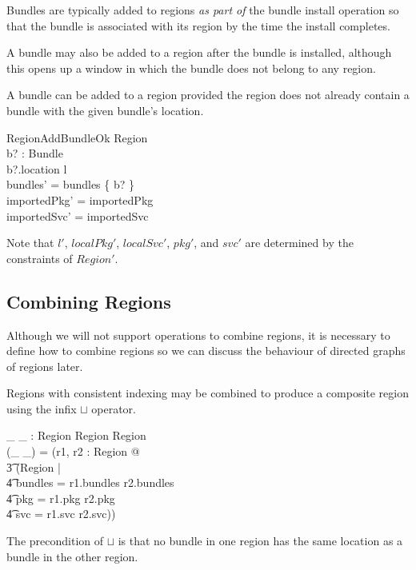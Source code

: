\documentclass[a4paper,9pt]{article}
\begin{document}
Bundles are typically added to regions \textit{as part of} the bundle install operation
so that the bundle is associated with its region by the time the
install completes.

A bundle may also be added to a region after the bundle is installed, although this opens up a window in
which the bundle does not belong to any region.

A bundle can be added to a region provided the region does not already contain a bundle with
the given bundle's location.
\begin{schema}{RegionAddBundleOk}
  \Delta Region \\
  b? : Bundle \\
\where
  b?.location \notin \dom l \\
  bundles' = bundles \cup \{ b? \} \\
  importedPkg' = importedPkg \\
  importedSvc' = importedSvc \\
\end{schema}
Note that $l'$, $localPkg'$, $localSvc'$, $pkg'$, and $svc'$ are determined by the constraints of $Region'$.

\subsection{Combining Regions}

Although we will not support operations to combine regions, it is necessary to define how to combine
regions so we can discuss the behaviour of directed graphs of regions later.

Regions with consistent indexing may be combined to produce a composite region using the infix $\sqcup$ operator.
\begin{axdef}
 \_ \sqcup \_ : Region \cross Region \pfun Region \\
\where
 (\_ \sqcup \_) = (\lambda r1, r2 : Region @ \\
\t3 (\mu Region | \\
\t4 bundles = r1.bundles \cup r2.bundles \land \\
\t4 pkg = r1.pkg \cup r2.pkg \land \\
\t4 svc = r1.svc \cup r2.svc)) \\
\end{axdef}
The precondition of $\sqcup$ is that no bundle in one region has the same location as a bundle in the other region.
\end{document}
